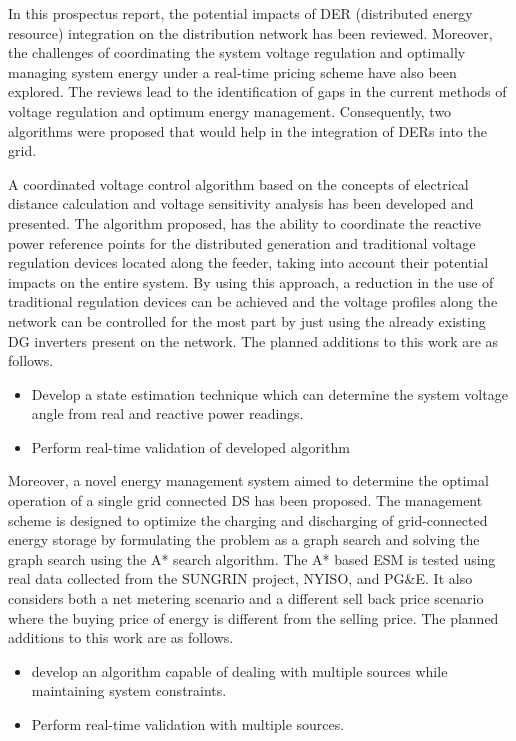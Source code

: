 In this prospectus report, the potential impacts of DER (distributed energy resource) integration on the distribution network has been reviewed. Moreover, the challenges of coordinating the system voltage regulation and optimally managing system energy under a real-time pricing scheme have also been explored. The reviews lead to the identification of gaps in the current methods of voltage regulation and optimum energy management. Consequently, two algorithms were proposed that would help in the integration of DERs into the grid.

A coordinated voltage control algorithm based on the concepts of electrical distance calculation and voltage sensitivity analysis has been developed and presented. The algorithm proposed, has the ability to coordinate the reactive power reference points for the distributed generation and traditional voltage regulation devices located along the feeder, taking into account their potential impacts on the entire system. By using this approach, a reduction in the use of traditional regulation devices can be achieved and the voltage profiles along the network can be controlled for the most part by just using the already existing DG inverters present on the network. The planned additions to this work are as follows.

\begin{itemize}
    \item Develop a state estimation technique which can determine the system voltage angle from real and reactive power readings.
    \item Perform real-time validation of developed algorithm
\end{itemize}

Moreover, a novel energy management system aimed to determine the optimal operation of a single grid connected DS has been proposed. The management scheme is designed to optimize the charging and discharging of grid-connected energy storage by formulating the problem as a graph search and solving the graph search using the A* search algorithm. The A* based ESM is tested using real data collected from the SUNGRIN project, NYISO, and PG\&E. It also considers both a net metering scenario and a different sell back price scenario where the buying price of energy is different from the selling price.  The planned additions to this work are as follows.

\begin{itemize}
    \item develop an algorithm capable of dealing with multiple sources while maintaining system constraints.
    \item Perform real-time validation with multiple sources.
\end{itemize}

